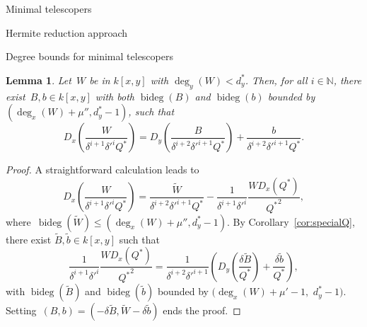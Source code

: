 \documentclass{sig-alt-full}
\newcommand{\bideg}{\operatorname{bideg}}
\newcommand{\bN}{\mathbb{N}}
\newtheorem{lemma}{Lemma}
\begin{document}
\begin{section}{Minimal telescopers}
\begin{subsection}{Hermite reduction approach}
\begin{subsubsection}{Degree bounds for minimal telescopers}
\begin{lemma} \label{le:special}
Let~$W$ be in $k[x, y]$ with $\deg_y(W) < d_y^*$. Then, for all $i
\in \bN$, there exist~$B, b\in k[x, y]$ with both $\bideg(B)$ and
$\bideg(b)$ bounded by~$(\deg_x(W) + \mu'', d_y^*-1)$, such that
\[ D_x\left(\frac{W}{{\delta}^{i+1} {\delta'}^i Q^*}\right) = D_y \left( \frac{B}{\delta ^{i+2} {\delta'}^{i+1} Q^*} \right)
+ \frac{b}{\delta ^{i+2} {\delta'}^{i+1} Q^*}.\]
\end{lemma}

\begin{proof}
A straightforward calculation leads to
\[  D_x \left(\frac{W}{{\delta}^{i+1}  {\delta'}^i Q^*}\right) = \frac{\tilde W}{{\delta}^{i+2} {\delta'}^{i+1} Q^*}
- \frac{1}{{\delta}^{i+1} {\delta'}^i} \frac{W D_x(Q^*)}{{Q^*}^2},
\]
where~$\bideg(\tilde{W}) \le (\deg_x(W) + \mu'', d_y^* -1)$.
By Corollary~\ref{cor:specialQ},
there exist $\tilde{B}, \tilde {b}\in k[x,y]$ such that
\[ \frac{1}{{\delta}^{i+1} {\delta'}^i} \frac{W D_x(Q^*)}{{Q^*}^2}
   = \frac{1}{{\delta}^{i+2} {\delta'}^{i+1}} \left( D_y \left(\frac{\delta  \tilde B }{Q^*} \right) + \frac{
{\delta} \tilde b }{Q^*} \right), \]
with $\bideg(\tilde{B})$ and $\bideg(\tilde{b})$ bounded by
$({\deg_x(W) + \mu'-1},$ ${d_y^*-1})$.
Setting~$(B, b) = (-{\delta} \tilde B, \tilde{W}- \delta \tilde b)$
ends the proof.
\end{proof}


\end{subsubsection}
\end{subsection}
\end{section}
\end{document}
